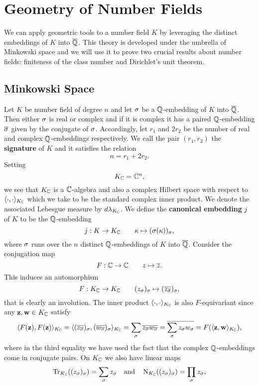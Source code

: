 \chapter{Geometry of Number Fields}
  We can apply geometric tools to a number field $K$ by leveraging the distinct embeddings of $K$ into $\overline{\mathbb{Q}}$. This theory is developed under the umbrella of Minkowski space and we will use it to prove two crucial results about number fields: finiteness of the class number and Dirichlet's unit theorem.
  \section{Minkowski Space}
    Let $K$ be number field of degree $n$ and let $\sigma$ be a $\mathbb{Q}$-embedding of $K$ into $\overline{\mathbb{Q}}$. Then either $\sigma$ is real or complex and if it is complex it has a paired $\mathbb{Q}$-embedding $\overline{\sigma}$ given by the conjugate of $\sigma$. Accordingly, let $r_{1}$ and $2r_{2}$ be the number of real and complex $\mathbb{Q}$-embeddings respectively. We call the pair $(r_{1},r_{2})$ the \textbf{signature} of $K$ and it satisfies the relation
    \[
      n = r_{1}+2r_{2}.
    \]
    Setting
    \[
      K_{\mathbb{C}} = \mathbb{C}^{n},
    \]
    we see that $K_{\mathbb{C}}$ is a $\mathbb{C}$-algebra and also a complex Hilbert space with respect to $\langle\cdot,\cdot\rangle_{K_{\mathbb{C}}}$ which we take to be the standard complex inner product. We denote the associated Lebesgue measure by $d\lambda_{K_{\mathbb{C}}}$. We define the \textbf{canonical embedding} $j$ of $K$ to be the $\mathbb{Q}$-embedding
    \[
      j:K \to K_{\mathbb{C}} \qquad \kappa \mapsto (\sigma(\kappa))_{\sigma},
    \]
    where $\sigma$ runs over the $n$ distinct $\mathbb{Q}$-embeddings of $K$ into $\overline{\mathbb{Q}}$. Consider the conjugation map
    \[
      F:\mathbb{C} \to \mathbb{C} \qquad z \mapsto \overline{z}.
    \]
    This induces an automorphism
    \[
      F:K_{\mathbb{C}} \to K_{\mathbb{C}} \qquad (z_{\sigma})_{\sigma} \mapsto (\overline{z_{\overline{\sigma}}})_{\sigma},
    \]
    that is clearly an involution. The inner product $\langle\cdot,\cdot\rangle_{K_{\mathbb{C}}}$ is also $F$-equivariant since any $\mathbf{z},\mathbf{w} \in K_{\mathbb{C}}$ satisfy
    \[
      \langle F(\mathbf{z}),F(\mathbf{z})\rangle_{K_{\mathbb{C}}} = \langle(\overline{z_{\overline{\sigma}}})_{\sigma},(\overline{w_{\overline{\sigma}}})_{\sigma}\rangle_{K_{\mathbb{C}}} = \sum_{\sigma}\overline{z_{\overline{\sigma}}w_{\overline{\sigma}}} = \overline{\sum_{\sigma}z_{\sigma}w_{\sigma}} = F(\langle\mathbf{z},\mathbf{w}\rangle_{K_{\mathbb{C}}}),
    \]
    where in the third equality we have used the fact that the complex $\mathbb{Q}$-embeddings come in conjugate pairs. On $K_{\mathbb{C}}$ we also have linear maps
    \[
      \operatorname{\mathrm{Tr}}_{K_{\mathbb{C}}}((z_{\sigma})_{\sigma}) = \sum_{\sigma}z_{\sigma} \quad \text{and} \quad \operatorname{\mathrm{N}}_{K_{\mathbb{C}}}((z_{\sigma})_{\sigma}) = \prod_{\sigma}z_{\sigma},
    \]
